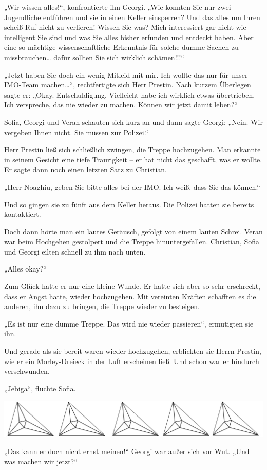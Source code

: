 \documentclass[oneside]{memoir}
\newcommand{\parasep}{
\bigskip
\bigskip
\begin{center} 
   \includegraphics[scale=.08]{parasep5.jpg} 
\end{center}
\bigskip
\bigskip
}
\begin{document}
„Wir wissen alles!“, konfrontierte ihn Georgi. „Wie konnten Sie nur zwei Jugendliche entführen und sie in einen Keller einsperren? Und das alles um Ihren scheiß Ruf nicht zu verlieren! Wissen Sie was? Mich interessiert gar nicht wie intelligent Sie sind und was Sie alles bisher erfunden und entdeckt haben. Aber eine so mächtige wissenschaftliche Erkenntnis für solche dumme Sachen zu missbrauchen\ldots{} dafür sollten Sie sich wirklich schämen!!!“

„Jetzt haben Sie doch ein wenig Mitleid mit mir. Ich wollte das nur für unser IMO-Team machen\ldots“, rechtfertigte sich Herr Prestin. Nach kurzem Überlegen sagte er: „Okay. Entschuldigung. Vielleicht habe ich wirklich etwas übertrieben. Ich verspreche, das nie wieder zu machen. Können wir jetzt damit leben?“

Sofia, Georgi und Veran schauten sich kurz an und dann sagte Georgi: 
„Nein. Wir vergeben Ihnen nicht. Sie müssen zur Polizei.“

Herr Prestin ließ sich schließlich zwingen, die Treppe hochzugehen. Man erkannte in seinem Gesicht eine tiefe Traurigkeit -- er hat nicht das geschafft, was er wollte. Er sagte dann noch einen letzten Satz zu Christian.

„Herr Noaghiu, geben Sie bitte alles bei der IMO. Ich weiß, dass Sie das können.“

Und so gingen sie zu fünft aus dem Keller heraus. Die Polizei hatten sie bereits kontaktiert.

Doch dann hörte man ein lautes Geräusch, gefolgt von einem lauten Schrei. Veran war beim Hochgehen gestolpert und die Treppe hinuntergefallen. Christian, Sofia und Georgi eilten schnell zu ihm nach unten.

„Alles okay?“

Zum Glück hatte er nur eine kleine Wunde. Er hatte sich aber so sehr erschreckt, dass er Angst hatte, wieder hochzugehen. Mit vereinten Kräften schafften es die anderen, ihn dazu zu bringen, die Treppe wieder zu besteigen.

„Es ist nur eine dumme Treppe. Das wird nie wieder passieren“, ermutigten sie ihn.

Und gerade als sie bereit waren wieder hochzugehen, erblickten sie Herrn Prestin, wie er ein Morley-Dreieck in der Luft erscheinen ließ. Und schon war er hindurch verschwunden.

„Jebiga“, fluchte Sofia.

\parasep
     
„Das kann er doch nicht ernst meinen!“ Georgi war außer sich vor Wut. „Und was machen wir jetzt?“
\end{document}
